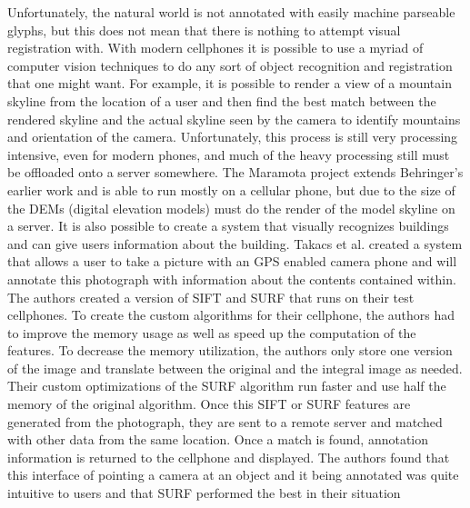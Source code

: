 \documentclass{acm_proc_article-sp}
\begin{document}
Unfortunately, the natural world is not annotated with easily machine parseable glyphs, but this does not mean that there is nothing to attempt visual registration with.  With modern cellphones it is possible to use a myriad of computer vision techniques to do any sort of object recognition and registration that one might want.   For example, it is possible to render a view of a mountain skyline from the location of a user and then find the best match between the rendered skyline and the actual skyline seen by the camera to identify mountains and orientation of the camera. \cite{behringer2002registration}  Unfortunately, this process is still very processing intensive, even for modern phones, and much of the heavy processing still must be offloaded onto a server somewhere.  The Maramota project extends Behringer's earlier work and is able to run mostly on a cellular phone, but due to the size of the DEMs (digital elevation models) must do the render of the model skyline on a server. \cite{chippendale2009environmental}
It is also possible to create a system that visually recognizes buildings and can give users information about the building. Takacs et al. created a system that allows a user to take a picture with an GPS enabled camera phone and will annotate this photograph with information about the contents contained within.  The authors created a version of SIFT \cite{lowe1999object} and SURF \cite{bay2006surf} that runs on their test cellphones.  To create the custom algorithms for their cellphone, the authors had to improve the memory usage as well as speed up the computation of the features. To decrease the memory utilization, the authors only store one version of the image and translate between the original and the integral image as needed.  Their custom optimizations of the SURF algorithm run faster and use half the memory of the original algorithm.  Once this SIFT or SURF features are generated from the photograph, they are sent to a remote server and matched with other data from the same location.  Once a match is found, annotation information is returned to the cellphone and displayed.  The authors found that this interface of pointing a camera at an object and it being annotated was quite intuitive to users and that SURF performed the best in their situation  \cite{takacs2008outdoors}
\end{document}
